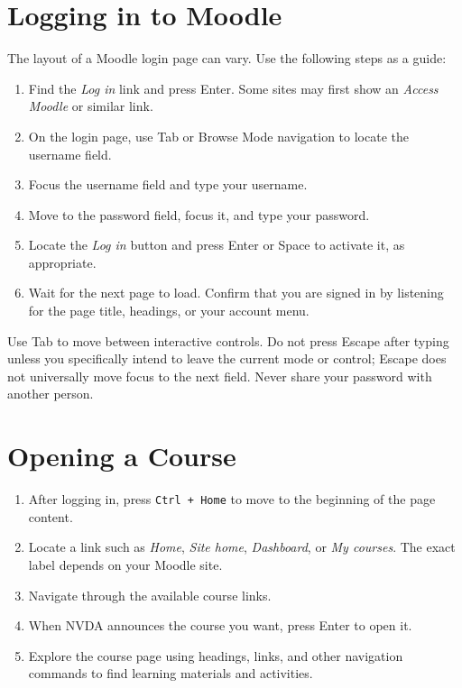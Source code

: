 \documentclass[11pt,oneside]{book}
\begin{document}
\chapter{Logging in to Moodle}
The layout of a Moodle login page can vary. Use the following steps as a guide:
\begin{enumerate}
	\item Find the \textit{Log in} link and press Enter. Some sites may first show an \textit{Access Moodle} or similar link.
	\item On the login page, use Tab or Browse Mode navigation to locate the username field.
	\item Focus the username field and type your username.
	\item Move to the password field, focus it, and type your password.
	\item Locate the \textit{Log in} button and press Enter or Space to activate it, as appropriate.
	\item Wait for the next page to load. Confirm that you are signed in by listening for the page title, headings, or your account menu.
\end{enumerate}
Use Tab to move between interactive controls. Do not press Escape after typing unless you specifically intend to leave the current mode or control; Escape does not universally move focus to the next field. Never share your password with another person.

\chapter{Opening a Course}
\begin{enumerate}
	\item After logging in, press \texttt{Ctrl + Home} to move to the beginning of the page content.
	\item Locate a link such as \textit{Home}, \textit{Site home}, \textit{Dashboard}, or \textit{My courses}. The exact label depends on your Moodle site.
	\item Navigate through the available course links.
	\item When NVDA announces the course you want, press Enter to open it.
	\item Explore the course page using headings, links, and other navigation commands to find learning materials and activities.
\end{enumerate}
\end{document}
